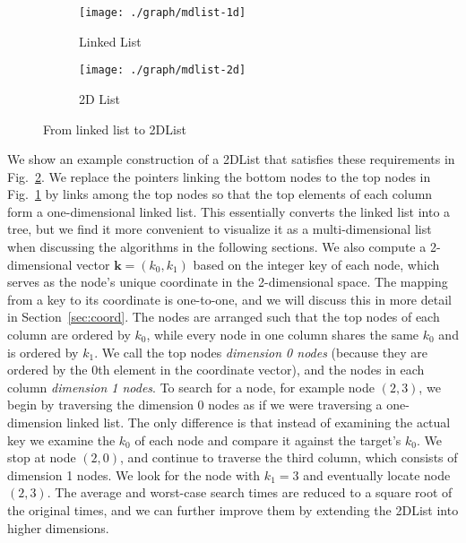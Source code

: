 \documentclass[10pt,journal,letterpaper,compsoc]{IEEEtran}
\begin{document}
\begin{figure}[h]
    \begin{subfigure}{0.48\columnwidth}
        \centering
        \texttt{[image: ./graph/mdlist-1d]}
        \caption{Linked List}
        \label{fig:mdlist1d}
    \end{subfigure}
    \hfill
    \begin{subfigure}{0.48\columnwidth}
        \centering
        \texttt{[image: ./graph/mdlist-2d]}
        \caption{2D List}
        \label{fig:mdlist2d}
    \end{subfigure}
    \caption{From linked list to 2DList}
    \label{fig:mdlist}
\end{figure}

We show an example construction of a 2DList that satisfies these requirements in Fig.~\ref{fig:mdlist2d}.
We replace the pointers linking the bottom nodes to the top nodes in Fig.~\ref{fig:mdlist1d} by links among the top nodes so that the top elements of each column form a one-dimensional linked list.
This essentially converts the linked list into a tree, but we find it more convenient to visualize it as a multi-dimensional list when discussing the algorithms in the following sections.
We also compute a 2-dimensional vector $\mathbf{k}=(k_0,k_1)$ based on the integer key of each node, which serves as the node's unique coordinate in the 2-dimensional space.
The mapping from a key to its coordinate is one-to-one, and we will discuss this in more detail in Section~\ref{sec:coord}.
The nodes are arranged such that the top nodes of each column are ordered by $k_0$, while every node in one column shares the same $k_0$ and is ordered by $k_1$.
We call the top nodes \emph{dimension 0 nodes} (because they are ordered by the 0th element in the coordinate vector), and the nodes in each column \emph{dimension 1 nodes}.
To search for a node, for example node $(2,3)$, we begin by traversing the dimension 0 nodes as if we were traversing a one-dimension linked list.
The only difference is that instead of examining the actual key we examine the $k_0$ of each node and compare it against the target's $k_0$.
We stop at node $(2,0)$, and continue to traverse the third column, which consists of dimension 1 nodes. 
We look for the node with $k_1 = 3$ and eventually locate node $(2,3)$.
The average and worst-case search times are reduced to a square root of the original times, and we can further improve them by extending the 2DList into higher dimensions.

\theoremstyle{definition}
\end{document}
